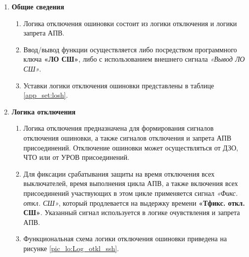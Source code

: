 \color{black}

\begin{enumerate}

\item \textbf{Общие сведения}

\begin{enumerate}

\item 
Логика отключения ошиновки состоит из логики отключения и логики запрета АПВ.

\item 
Ввод/вывод функции осуществляется либо посредством программного ключа \textbf{«ЛО СШ»}, либо с использованием внешнего сигнала \textit{«Вывод ЛО СШ»}.

\item 
Уставки логики отключения ошиновки представлены в таблице \ref{app_set:losh}.

\end{enumerate}


\item \textbf{Логика отключения}

\begin{enumerate}

\item
Логика отключения предназначена для формирования сигналов отключения ошиновки, а также сигналов отключения и запрета АПВ присоединений. Отключение ошиновки может осуществляться от ДЗО, ЧТО или от УРОВ присоединений.

\item
Для фиксации срабатывания защиты на время отключения всех выключателей, время выполнения цикла АПВ, а также включения всех присоединений участвующих в этом цикле применяется сигнал \textit{«Фикс. откл. СШ»}, который продлевается на выдержку времени \textbf{«Тфикс. откл. СШ»}. Указанный сигнал используется в логике очувствления и запрета АПВ.

\item
Функциональная схема логики отключения ошиновки приведена на рисунке \ref{pic_lo:Log_otkl_ssh}.


\end{enumerate}
\end{enumerate}
